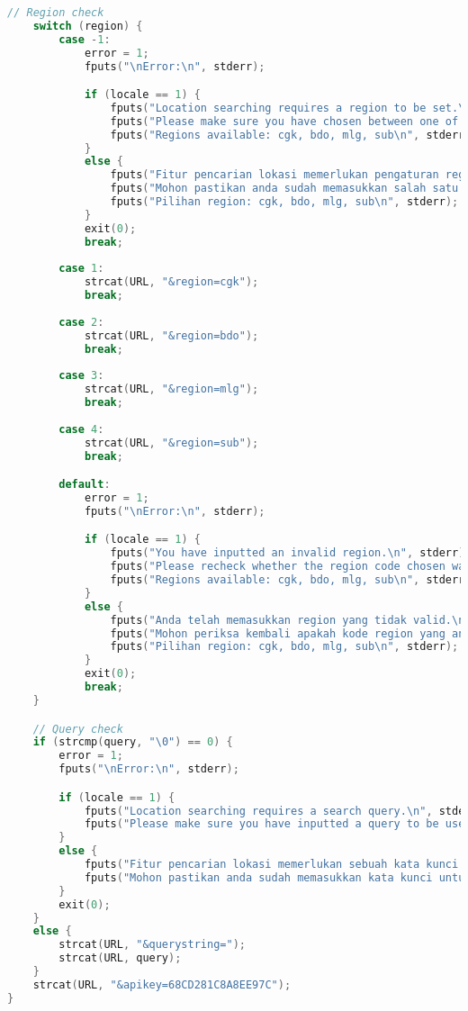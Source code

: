 \begin{itemize}[listparindent=\parindent]
\begin{lstlisting}[language=C, caption=Implementasi fungsi build\textunderscore url\textunderscore searchplace(), label=code:kiritool-function-buildurl-searchplace]
    // Region check
    switch (region) {
        case -1:
            error = 1;
            fputs("\nError:\n", stderr);

            if (locale == 1) {
                fputs("Location searching requires a region to be set.\n", stderr);
                fputs("Please make sure you have chosen between one of the four available regions.\n", stderr);
                fputs("Regions available: cgk, bdo, mlg, sub\n", stderr);
            }
            else {
                fputs("Fitur pencarian lokasi memerlukan pengaturan region lokasi yang ingin dicari.\n", stderr);
                fputs("Mohon pastikan anda sudah memasukkan salah satu dari empat kode region yang tersedia.\n", stderr);
                fputs("Pilihan region: cgk, bdo, mlg, sub\n", stderr);
            }
            exit(0);
            break;
        
        case 1:
            strcat(URL, "&region=cgk");
            break;
        
        case 2:
            strcat(URL, "&region=bdo");
            break;
        
        case 3:
            strcat(URL, "&region=mlg");
            break;
        
        case 4:
            strcat(URL, "&region=sub");
            break;

        default:
            error = 1;
            fputs("\nError:\n", stderr);

            if (locale == 1) {
                fputs("You have inputted an invalid region.\n", stderr);
                fputs("Please recheck whether the region code chosen was one of the four region codes supported.\n", stderr);
                fputs("Regions available: cgk, bdo, mlg, sub\n", stderr);
            }
            else {
                fputs("Anda telah memasukkan region yang tidak valid.\n", stderr);
                fputs("Mohon periksa kembali apakah kode region yang anda masukkan merupakan salah satu dari empat kode region yang tersedia.\n", stderr);
                fputs("Pilihan region: cgk, bdo, mlg, sub\n", stderr);
            }
            exit(0);
            break;
    }

    // Query check
    if (strcmp(query, "\0") == 0) {
        error = 1;
        fputs("\nError:\n", stderr);

        if (locale == 1) {
            fputs("Location searching requires a search query.\n", stderr);
            fputs("Please make sure you have inputted a query to be used in the search.\n", stderr);
        }
        else {
            fputs("Fitur pencarian lokasi memerlukan sebuah kata kunci pencarian.\n", stderr);
            fputs("Mohon pastikan anda sudah memasukkan kata kunci untuk melakukan pencarian lokasi.\n", stderr);
        }
        exit(0);
    }
    else {
        strcat(URL, "&querystring=");
        strcat(URL, query);
    }
    strcat(URL, "&apikey=68CD281C8A8EE97C");
}
	\end{lstlisting}
	

\end{itemize}
